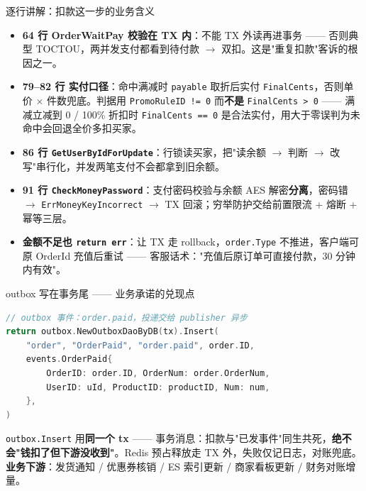 \documentclass[aspectratio=169,11pt]{beamer}
\begin{document}
\begin{frame}[shrink]{逐行讲解：扣款这一步的业务含义}
\begin{itemize}\small
  \item \textbf{64 行 OrderWaitPay 校验在 TX 内}：不能 TX 外读再进事务 —— 否则典型 TOCTOU，两并发支付都看到待付款 $\to$ 双扣。这是"重复扣款"客诉的根因之一。
  \item \textbf{79--82 行 实付口径}：命中满减时 \texttt{payable} 取折后实付 \texttt{FinalCents}，否则单价 $\times$ 件数兜底。判据用 \texttt{PromoRuleID != 0} 而\textbf{不是} \texttt{FinalCents > 0} —— 满减立减到 0 / 100\% 折扣时 \texttt{FinalCents == 0} 是合法实付，用大于零误判为未命中会回退全价多扣买家。
  \item \textbf{86 行 \texttt{GetUserByIdForUpdate}}：行锁读买家，把"读余额 $\to$ 判断 $\to$ 改写"串行化，并发两笔支付不会都拿到旧余额。
  \item \textbf{91 行 \texttt{CheckMoneyPassword}}：支付密码校验与余额 AES 解密\textbf{分离}，密码错 $\to$ \texttt{ErrMoneyKeyIncorrect} $\to$ TX 回滚；穷举防护交给前置限流 + 熔断 + 幂等三层。
  \item \textbf{金额不足也 \texttt{return err}}：让 TX 走 rollback，\texttt{order.Type} 不推进，客户端可原 OrderId 充值后重试 —— 客服话术："充值后原订单可直接付款，30 分钟内有效"。
\end{itemize}
\end{frame}

\begin{frame}{outbox 写在事务尾 —— 业务承诺的兑现点}
\begin{lstlisting}[language=Go,firstnumber=208,
  caption={}]
// outbox 事件：order.paid，投递交给 publisher 异步
return outbox.NewOutboxDaoByDB(tx).Insert(
    "order", "OrderPaid", "order.paid", order.ID,
    events.OrderPaid{
        OrderID: order.ID, OrderNum: order.OrderNum,
        UserID: uId, ProductID: productID, Num: num,
    },
)
\end{lstlisting}
\vspace{1mm}
\small \texttt{outbox.Insert} 用\textbf{同一个 tx} —— 事务消息：扣款与"已发事件"同生共死，\textbf{绝不会"钱扣了但下游没收到"}。Redis 预占释放走 TX 外，失败仅记日志，对账兜底。\textbf{业务下游}：发货通知 / 优惠券核销 / ES 索引更新 / 商家看板更新 / 财务对账增量。
\end{frame}
\end{document}
